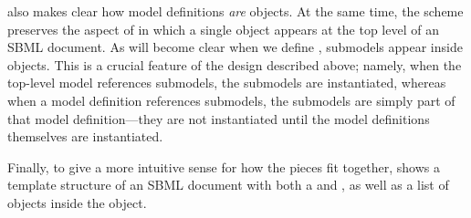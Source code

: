  also makes clear how model definitions \emph{are} \Model objects.  At the same time, the scheme preserves the aspect of \sbmlthreecore in which a single \Model object appears at the top level of an SBML document.  As will become clear when we define \Model, submodels appear inside \Model objects.  This is a crucial feature of the design described above; namely, when the top-level model references submodels, the submodels are instantiated, whereas when a model definition references submodels, the submodels are simply part of that model definition---they are not instantiated until the model definitions themselves are instantiated.

Finally, to give a more intuitive sense for how the pieces fit together,  shows a template structure of an SBML document with both a  and , as well as a list of \Submodel objects inside the \Model object.

\newcommand{\sayOptional}{\raisebox{0pt}[0pt][0pt]{\bigg\} \textrm{\emph{optional}}}}

